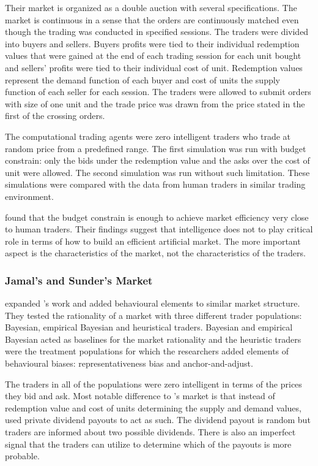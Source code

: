 Their market is organized as a double auction with several
specifications. The market is continuous in a sense that the 
orders are continuously matched even though the trading was
conducted in specified sessions. The traders were divided 
into buyers and sellers. Buyers profits were tied to their 
individual redemption values that were gained at the end of
each trading session for each unit bought and sellers' profits
were tied to their individual cost of unit. Redemption values
represent the demand function of each buyer and cost of units 
the supply function of each seller for each session. The
traders were allowed to submit orders with size of one unit
and the trade price was drawn from the price stated in the 
first of the crossing orders.

The computational trading agents were zero intelligent traders 
who trade at random price from a predefined range. 
The first simulation was run with budget constrain: only the bids
under the redemption value and the asks over the cost of unit 
were allowed. The second simulation was run without such limitation.
These simulations were compared with the data from human traders
in similar trading environment.

\citeauthor{God93} found that the budget constrain is enough to 
achieve market efficiency very close to human traders. Their findings
suggest that intelligence does not to play critical role in terms of 
how to build an efficient artificial market. The more important aspect
is the characteristics of the market, not the characteristics of the traders.

\subsubsection{Jamal's and Sunder's Market}
\citet{Jam96} expanded \citeauthor{God93}'s work and added behavioural 
elements to similar market structure. They tested the rationality of
a market with three different trader populations: Bayesian, empirical
Bayesian and heuristical traders. Bayesian and empirical Bayesian acted
as baselines for the market rationality and the heuristic traders were
the treatment populations for which the researchers added elements of behavioural
biases: representativeness bias and anchor-and-adjust. 

The traders in all of the populations were zero intelligent in terms of the
prices they bid and ask. Most notable difference to \citet{God93}'s market
is that instead of redemption value and cost of units determining the
supply and demand values, \citeauthor{Jam96} used private dividend payouts 
to act as such. The dividend payout is random but traders are informed
about two possible dividends. There is also an imperfect signal that the
traders can utilize to determine which of the payouts is more probable. 


